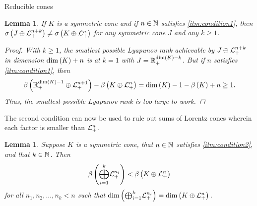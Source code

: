 \documentclass{interact}
\theoremstyle{plain}
\newtheorem{lemma}[theorem]{Lemma}
\theoremstyle{definition}
\theoremstyle{remark}
\newcommand*{\signature}[1]{ \sigma\of{#1} }
\begin{document}
\begin{section}{Reducible cones}
    \begin{lemma}\label{lem:no bigger factors}
      If $K$ is a symmetric cone and if $n \in \Nn[1]$ satisfies
      \cref{itm:condition1}, then
      $\signature{\directsum{J}{\Lnplus[n+k]}} \ne
      \signature{\directsum{K}{\Lnplus}}$ for any symmetric cone $J$
      and any $k \ge 1$.
      \begin{proof}
        With $k \ge 1$, the smallest possible Lyapunov rank achievable
        by $\directsum{J}{\Lnplus[n+k]}$ in dimension $\dim\of{K}+n$
        is at $k = 1$ with $J = \Rnplus[\dim\of{K} - k]$. But if $n$
        satisfies \cref{itm:condition1}, then
        \begin{equation*}
          \lyapunovrank{\Rnplus[\dim\of{K} - 1] \oplus \Lnplus[n+1]}
          -
          \lyapunovrank{K \oplus \Lnplus}
          =
          \dim\of{K} - 1 - \lyapunovrank{K} + n
          \ge
          1.
        \end{equation*}
        Thus, the smallest possible Lyapunov rank is too large to work.
      \end{proof}
    \end{lemma}

    The second condition can now be used to rule out sums of Lorentz
    cones wherein each factor is smaller than $\Lnplus$.

    \begin{lemma}\label{lem:not all smaller factors}
      Suppose $K$ is a symmetric cone, that $n \in \Nn[1]$ satisfies
      \cref{itm:condition2}, and that $k \in \Nn[1]$. Then
      \begin{equation*}
        \lyapunovrank{\directsummany{i=1}{k}{\Lnplus[n_{i}]}}
        <
        \lyapunovrank{\directsum{K}{\Lnplus}}
      \end{equation*}
      for all $n_{1},n_{2},\ldots,n_{k} < n$ such that
      $\dim\of{\directsummany{i=1}{k}{\Lnplus[n_{i}]}} =
      \dim\of{\directsum{K}{\Lnplus}}$.


\end{lemma}
\end{section}
\end{document}

